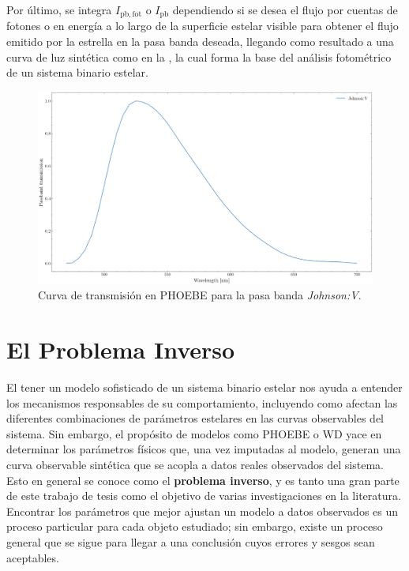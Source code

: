 Por último, se integra $I_{\mathrm{pb}, \mathrm{fot}}$ o $I_{\mathrm{pb}}$\textemdash
dependiendo si se desea el flujo por cuentas de fotones o en energía\textemdash
a lo largo de la superficie estelar visible para obtener el flujo emitido por la
estrella en la pasa banda deseada, llegando como resultado a una curva de luz
sintética como en la , la cual
forma la base del análisis fotométrico de un sistema binario estelar.

\begin{figure}[!ht]
	\centering
	\includegraphics[scale=0.4]{Introduccion/Figures/Figura PHOEBE JohnsonV Pasabanda.png}
	\caption{Curva de transmisión en PHOEBE para la pasa banda \textit{Johnson:V}.}
	\label{figuraPhoebePasabandaJohnsonV}
\end{figure}

\section{El Problema Inverso}

El tener un modelo sofisticado de un sistema binario estelar nos ayuda a
entender los mecanismos responsables de su comportamiento, incluyendo como
afectan las diferentes combinaciones de parámetros estelares en las curvas
observables del sistema. Sin embargo, el propósito de modelos como PHOEBE o WD
yace en determinar los parámetros físicos que, una vez imputadas al modelo,
generan una curva observable sintética que se acopla a datos reales observados
del sistema. Esto en general se conoce como el \textbf{problema inverso}, y es
tanto una gran parte de este trabajo de tesis como el objetivo de varias
investigaciones en la literatura. Encontrar los parámetros que mejor ajustan un
modelo a datos observados es un proceso particular para cada objeto estudiado;
sin embargo, existe un proceso general que se sigue para llegar a una conclusión
cuyos errores y sesgos sean aceptables.

